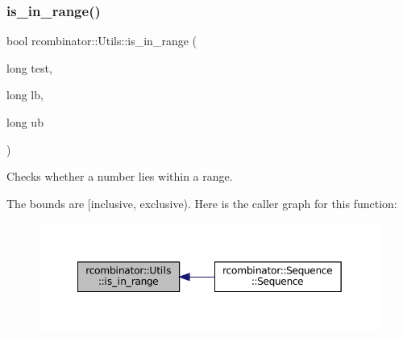 \subsubsection{\texorpdfstring{is\+\_\+in\+\_\+range()}{is\_in\_range()}}
{\footnotesize\ttfamily bool rcombinator\+::\+Utils\+::is\+\_\+in\+\_\+range (\begin{DoxyParamCaption}\item[{long}]{test,  }\item[{long}]{lb,  }\item[{long}]{ub }\end{DoxyParamCaption})\hspace{0.3cm}{\ttfamily [inline]}}



Checks whether a number lies within a range. 

The bounds are \mbox{[}inclusive, exclusive). Here is the caller graph for this function\+:
\nopagebreak
\begin{figure}[H]
\begin{center}
\leavevmode
\includegraphics[width=349pt]{namespacercombinator_1_1Utils_aa38fa31292dbf3a06522dc76b20e2572_icgraph}
\end{center}
\end{figure}
